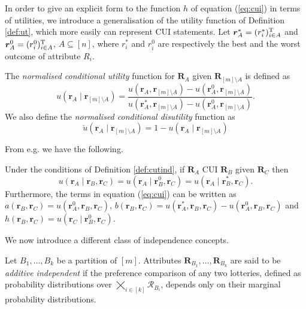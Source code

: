 In order to give an explicit form to the function $h$ of equation (\ref{eq:cui}) in terms of utilities, we introduce a generalisation of the utility function of Definition \ref{def:ut}, which more easily can represent CUI statements. Let $\bm{r}_A^{*}=(r_i^{*})^{\textnormal{T}}_{i\in A}$ and $\bm{r}_A^0=(r_i^0)^{\textnormal{T}}_{i\in A}$, $A\subseteq [n]$, where $r_i^*$ and $r_i^0$ are respectively the best and the worst outcome of attribute $R_i$. 

\begin{definition}
\label{def:cui}
The \emph{normalised conditional utility} function for $\bm{R}_A$ given $\bm{R}_{[m]\setminus A}$ is defined as
\begin{equation*}
u(\bm{r}_A\;|\; \bm{r}_{{[m]\setminus A}})=\frac{u(\bm{r}_A,\bm{r}_{[m]\setminus A})-u(\bm{r}_A^0,\bm{r}_{[m]\setminus A})}{u(\bm{r}_A^*,\bm{r}_{[m]\setminus A})-u(\bm{r}_A^0,\bm{r}_{[m]\setminus A})}.
\end{equation*}
We also define the \emph{normalised conditional disutility} function as
\begin{equation*}
\check{u}(\bm{r}_A\;|\;\bm{r}_{[m]\setminus A})=1-u(\bm{r}_A\;|\;\bm{r}_{[m]\setminus A})
\end{equation*}
\end{definition}

From e.g. \citet{Abbas2010} we have the following.
\begin{proposition}
Under the conditions of Definition \ref{def:cutind}, if $\bm{R}_A$ CUI $\bm{R}_B$ given $\bm{R}_C$ then
\begin{equation*}
u(\bm{r}_A\;|\; \bm{r}_B,\bm{r}_C)=u(\bm{r}_A\;|\; \bm{r}_B^0,\bm{r}_C)=u(\bm{r}_A\;|\; \bm{r}_B^{*},\bm{r}_C).
\end{equation*}
Furthermore, the terms in equation (\ref{eq:cui}) can be written as 
$
a(\bm{r}_B,\bm{r}_C)=u(\bm{r}_A^0,\bm{r}_B,\bm{r}_C)$, $b(\bm{r}_B,\bm{r}_C)=u(\bm{r}_A^*,\bm{r}_B,\bm{r}_C)-u(\bm{r}_A^0,\bm{r}_B,\bm{r}_C)$ and $h(\bm{r}_B,\bm{r}_C)=u(\bm{r}_C\;|\;\bm{r}_B^0,\bm{r}_C)$.
\end{proposition}

We now introduce a different class of independence concepts. 

\begin{definition}
Let $B_1,\dots,B_k$ be a partition of $[m]$. Attributes $\bm{R}_{B_1},\dots, \bm{R}_{B_k}$ are said  to be \emph{additive independent} if the preference comparison of any two lotteries, defined as probability distributions over $\bigtimes_{i\in[k]} \bm{\mathcal{R}}_{B_i}$, depends only on their marginal probability distributions.
\end{definition}

